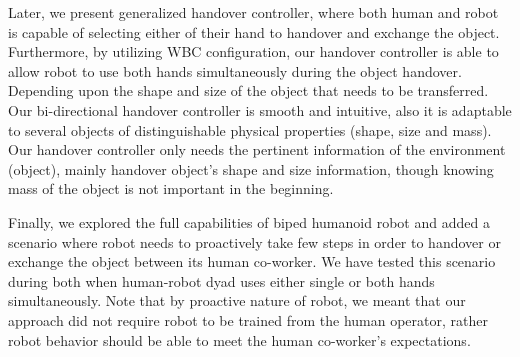 Later, we present generalized handover controller, where both human and robot is capable of selecting either of their hand to handover and exchange the object. Furthermore, by utilizing WBC configuration, our handover controller is able to allow robot to use both hands simultaneously during the object handover. Depending upon the shape and size of the object that needs to be transferred. Our bi-directional handover controller is smooth and intuitive, also it is adaptable to several objects of distinguishable physical properties (shape, size and mass). Our handover controller only needs the pertinent information of the environment (object), mainly handover object's shape and size information, though knowing mass of the object is not important in the beginning.

Finally, we explored the full capabilities of biped humanoid robot and added a scenario where robot needs to proactively take few steps in order to handover or exchange the object between its human co-worker. We have tested this scenario during both when human-robot dyad uses either single or both hands simultaneously. Note that by proactive nature of robot, we meant that our approach did not require robot to be trained from the human operator, rather robot behavior should be able to meet the human co-worker's expectations.





%



%
